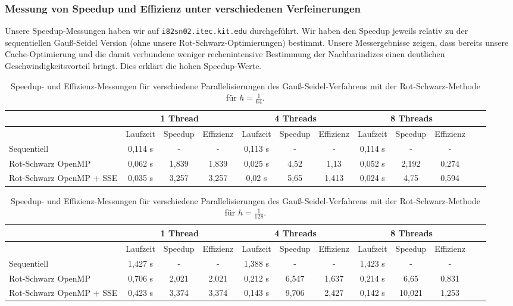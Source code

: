 \documentclass{article}
\begin{document}
\subsubsection*{Messung von Speedup und Effizienz unter verschiedenen Verfeinerungen} 

Unsere Speedup-Messungen haben wir auf \texttt{i82sn02.itec.kit.edu} durchgeführt. Wir haben den Speedup jeweils relativ zu der sequentiellen Gauß-Seidel Version (ohne unsere Rot-Schwarz-Optimierungen) bestimmt. Unsere Messergebnisse zeigen, dass bereits unsere Cache-Optimierung und die damit verbundene weniger rechenintensive Bestimmung der Nachbarindizes einen deutlichen Geschwindigkeitsvorteil bringt. Dies erklärt die hohen Speedup-Werte.

\begin{table}[h!]
\centering
\small
\begin{tabular}{p{1.5cm}|c|c|c|c|c|c|c|c|c|c|c}
 & \multicolumn{3}{c|}{1 Thread} & \multicolumn{3}{c|}{4 Threads} & \multicolumn{3}{c}{8 Threads}  \\ 
\hline 
 & Laufzeit & Speedup & Effizienz & Laufzeit & Speedup & Effizienz & Laufzeit & Speedup & Effizienz \\ 
\hline 
Sequentiell & 0,114 s & - & - & 0,113 s & - & - & 0,114 s & - & - \\
\hline
Rot-Schwarz OpenMP & 0,062 s & 1,839 & 1,839 & 0,025 s & 4,52 & 1,13 & 0,052 s & 2,192 & 0,274 \\ 
\hline
Rot-Schwarz OpenMP + SSE & 0,035 s & 3,257 & 3,257 & 0,02 s & 5,65 & 1,413 & 0,024 s & 4,75 & 0,594 \\ 
\hline 
\end{tabular}
\caption{Speedup- und Effizienz-Messungen für verschiedene Parallelisierungen des Gauß-Seidel-Verfahrens mit der Rot-Schwarz-Methode für $h=\frac{1}{64}$.}
\end{table}

\begin{table}[h!]
\centering
\small
\begin{tabular}{p{1.5cm}|c|c|c|c|c|c|c|c|c|c|c}
 & \multicolumn{3}{c|}{1 Thread} & \multicolumn{3}{c|}{4 Threads} & \multicolumn{3}{c}{8 Threads} \\ 
\hline 
 & Laufzeit & Speedup & Effizienz & Laufzeit & Speedup & Effizienz & Laufzeit & Speedup & Effizienz \\ 
\hline 
Sequentiell & 1,427 s & - & - & 1,388 s & - & - & 1,423 s & - & - \\
\hline
Rot-Schwarz OpenMP & 0,706 s & 2,021 & 2,021 & 0,212 s & 6,547 & 1,637 & 0,214 s & 6,65 & 0,831 \\ 
\hline
Rot-Schwarz OpenMP + SSE & 0,423 s & 3,374 & 3,374 & 0,143 s & 9,706 & 2,427 & 0,142 s & 10,021 & 1,253 \\ 
\hline 
\end{tabular}
\caption{Speedup- und Effizienz-Messungen für verschiedene Parallelisierungen des Gauß-Seidel-Verfahrens mit der Rot-Schwarz-Methode für $h=\frac{1}{128}$.}
\end{table}
\end{document}
